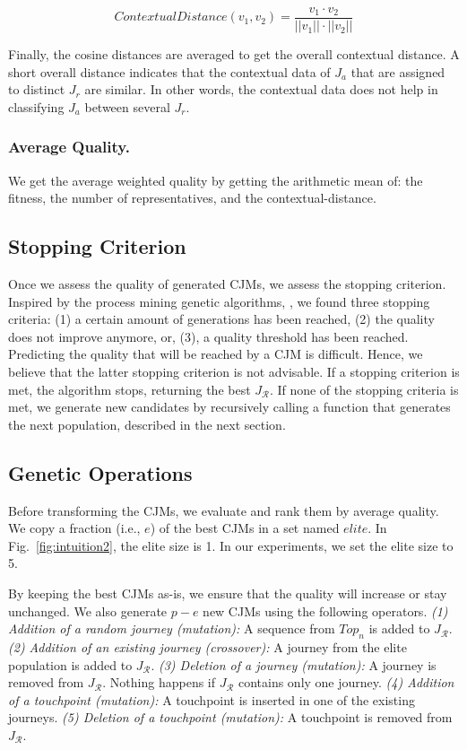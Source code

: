 \documentclass[runningheads]{llncs}
\begin{document}
{{\begin{equation}
    ContextualDistance({v_{1}}, {v_{2}}) = \frac{v_{1} \cdot v_{2}}{||v_{1} ||\cdot||v_{2}||} 
\end{equation}

Finally, the cosine distances are averaged to get the overall contextual distance. A short overall distance indicates that the contextual data of $J_a$ that are assigned to distinct $J_r$ are similar. In other words, the contextual data does not help in classifying $J_a$ between several $J_r$. 

\subsubsection{Average Quality.} We get the average weighted quality by getting the arithmetic mean of: the fitness, the number of representatives, and the contextual-distance. 

\subsection{Stopping Criterion}
Once we assess the quality of generated CJMs, we assess the stopping criterion. Inspired by the process mining genetic algorithms, \cite{buijs2012genetic,de2005genetic}, we found three stopping criteria: (1) a certain amount of generations has been reached, (2) the quality does not improve anymore, or, (3), a quality threshold has been reached. Predicting the quality that will be reached by a CJM is difficult. Hence, we believe that the latter stopping criterion is not advisable. If a stopping criterion is met, the algorithm stops, returning the best $J_{\mathcal{R}}$. If none of the stopping criteria is met, we generate new candidates by recursively calling a function that generates the next population, described in the next section.

\subsection{Genetic Operations}
Before transforming the CJMs, we evaluate and rank them by average quality. We copy a fraction (i.e., $e$) of the best CJMs in a set named {$elite$}. In Fig.~\ref{fig:intuition2}, the elite size is 1. In our experiments, we set the elite size to 5. 

By keeping the best CJMs as-is, we ensure that the quality will increase or stay unchanged. We also generate $p-e$ new CJMs using the following operators. {\it (1) Addition of a random journey (mutation):} A sequence from $Top_n$ is added to $J_{\mathcal{R}}$. {\it (2) Addition of an existing journey (crossover):} A journey from the elite population is added to $J_{\mathcal{R}}$. {\it (3) Deletion of a journey (mutation):} A journey is removed from $J_{\mathcal{R}}$. Nothing happens if $J_{\mathcal{R}}$ contains only one journey. {\it (4) Addition of a touchpoint (mutation):} A touchpoint is inserted in one of the existing journeys. {\it (5) Deletion of a touchpoint (mutation):} A touchpoint is removed from $J_{\mathcal{R}}$. 

}}
\end{document}
